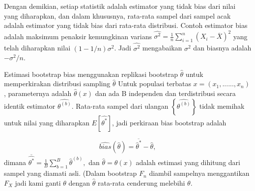 \documentclass[a4paper,12pt]{article}
\theoremstyle{definition}
\begin{document}
Dengan demikian, setiap statistik adalah estimator yang tidak bias dari nilai yang diharapkan, dan dalam
khususnya, rata-rata sampel dari sampel acak adalah estimator yang tidak bias dari rata-rata distribusi. Contoh estimator bias adalah maksimum penaksir kemungkinan varians $\widehat{\sigma ^{2}}=\frac{1}{n}\sum_{i=1}^{n}\left ( X_{i}-\overline{X} \right )^{2}$ yang telah diharapkan
nilai $\left ( 1-1/n \right ){\sigma }^{2}$. Jadi $\widehat{\sigma ^{2}}$ mengabaikan $\sigma ^{2}$ dan biasnya adalah $-\sigma ^{2}/n$.

Estimasi bootstrap bias menggunakan replikasi bootstrap $\widehat{\theta }$ untuk memperkirakan distribusi sampling $\widehat{\theta }$ Untuk populasi terbatas $x=\left ( x_{1},......,x_{n} \right )$, parameternya adalah $\widehat{\theta }\left ( x \right )$ dan ada B independen dan terdistribusi secara identik estimator $\widehat{\theta ^{\left ( b \right )}}$. Rata-rata sampel dari ulangan $\left \{ \widehat{\theta  ^{\left ( b \right )}} \right \}$ tidak memihak untuk nilai yang diharapkan $E\left [ \widehat{\theta ^{*}} \right ]$, jadi perkiraan bias bootstrap adalah

\begin{equation}
    \widehat{bias}\left ( \widehat{\theta } \right ) = \overline{\widehat{\theta  }^{*}}-\widehat{\theta },
\end{equation}
 dimana $\overline{\widehat{\theta ^{*}}}=\frac{1}{B}\sum_{b=1}^{B}\widehat{\theta }^{\left ( b \right )},$ dan $\widehat{\theta }=\widehat{\theta }(x)$ adalah estimasi yang dihitung dari
sampel yang diamati asli. (Dalam bootstrap $ F_{n}$ diambil sampelnya menggantikan $ F_{X}$ jadi kami ganti $\theta$ dengan $\widehat{\theta }$ rata-rata
cenderung melebihi $\theta$.
\end{document}
